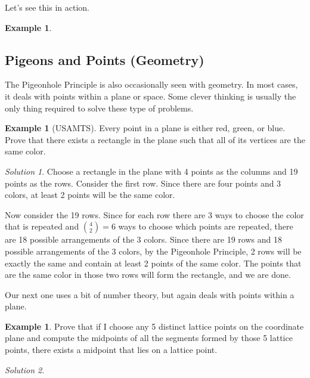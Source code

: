 \documentclass[l1pt]{article}
\theoremstyle{plain}
\theoremstyle{definition}
\newtheorem{example}[thm]{Example}
\theoremstyle{remark}
\newtheorem*{solution}{Solution}
\begin{document}
Let's see this in action.

\begin{example}

\end{example} 

\subsection{Pigeons and Points (Geometry)}

The Pigeonhole Principle is also occasionally seen with geometry. In most cases, it deals with points within a plane or space. Some clever thinking is usually the only thing required to solve these type of problems.

\begin{example}[USAMTS]
Every point in a plane is either red, green, or blue. Prove that there exists a rectangle in the plane such that all of its vertices are the same color.
\end{example}

\begin{solution}
Choose a rectangle in the plane with 4 points as the columns and 19 points as the rows. Consider the first row. Since there are four points and 3 colors, at least 2 points will be the same color. 

Now consider the 19 rows. Since for each row there are 3 ways to choose the color that is repeated and $\binom{4}{2}=6$ ways to choose which points are repeated, there are 18 possible arrangements of the 3 colors. Since there are 19 rows and 18 possible arrangements of the 3 colors, by the Pigeonhole Principle, 2 rows will be exactly the same and contain at least 2 points of the same color. The points that are the same color in those two rows will form the rectangle, and we are done.
\end{solution}

Our next one uses a bit of number theory, but again deals with points within a plane.

\begin{example}
Prove that if I choose any 5 distinct lattice points on the coordinate plane and compute the midpoints of all the segments formed by those 5 lattice points, there exists a midpoint that lies on a lattice point.
\end{example}

\begin{solution}

\end{solution}
\end{document}
